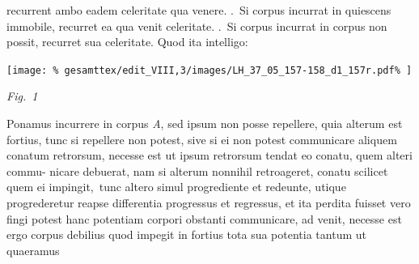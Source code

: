 \protect{}
recurrent ambo eadem celeritate qua venere.
\pend {}.\ Si corpus incurrat in quiescens immobile,%
\protect{}%
\protect{} recurret ea qua 
venit celeritate.
\pend 
{}.\ Si corpus incurrat in corpus 
%
 non possit, recurret sua celeritate.
Quod ita intelligo:
\pend
%
\vspace{1.5em} %
\centerline{%
\texttt{[image: \%
gesamttex/edit\_VIII,3/images/LH\_37\_05\_157-158\_d1\_157r.pdf\%
]}} 
\vspace{0.5em}
\centerline{%
\lbrack\textit{Fig.~1}\rbrack%
}
\vspace{1.5em}
%
\pstart
Ponamus 
%
incurrere in corpus \textit{A}, sed ipsum
non posse repellere, quia alterum est fortius,%
\protect{} tunc 
si repellere non potest, sive si ei non potest communicare
aliquem conatum retrorsum,%
\protect{} necesse est ut ipsum retrorsum 
tendat eo conatu, quem alteri commu-
\pend
\newpage
\pstart
\noindent nicare debuerat,
nam si alterum nonnihil retroageret, conatu%
\protect{} scilicet quem ei impingit\lbrack,\rbrack\
tunc altero simul progrediente
et redeunte, utique progrederetur reapse %
differentia progressus et regressus\protect{}, et ita perdita fuisset 
%
%
vero fingi potest hanc potentiam\protect{} corpori obstanti communicare, ad
%
%
venit, necesse est ergo %
corpus debilius\protect{} quod impegit 
in fortius%
\protect{} tota sua potentia\protect{} 
%
%
tantum ut quaeramus
